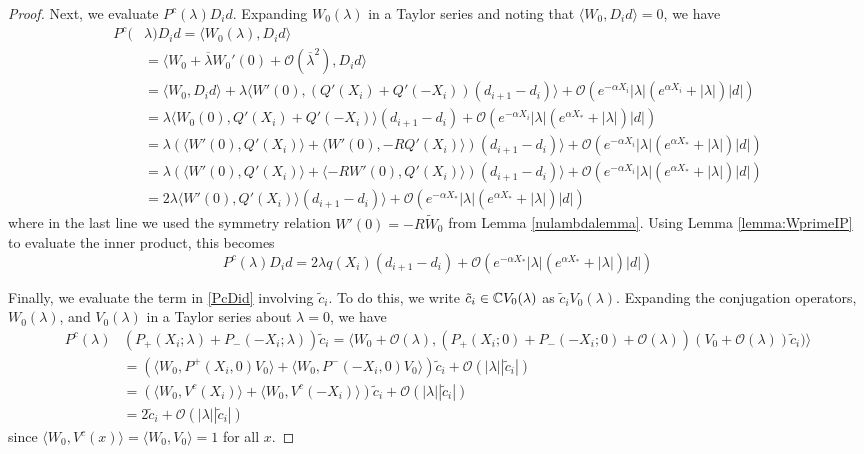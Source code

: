 \documentclass[thesis.tex]{subfiles}
\begin{document}
\begin{lemma}
\begin{proof}
Next, we evaluate $P^c(\lambda)D_i d$. Expanding $W_0(\lambda)$ in a Taylor series and noting that $\langle W_0, D_i d \rangle = 0$, we have 
\begin{align*}
P^c(&\lambda)D_i d = \langle W_0(\lambda), D_i d \rangle \\
&= \langle W_0 + \overline{\lambda} W_0'(0) + \mathcal{O}(\overline{\lambda}^2), D_i d \rangle \\
&= \langle W_0, D_i d \rangle + \lambda \langle W'(0), (Q'(X_i) + Q'(-X_i))(d_{i+1} - d_i ) \rangle + \mathcal{O}(e^{-\alpha X_i} |\lambda|(e^{\alpha X_i} + |\lambda|)|d|) \\
&= \lambda \langle W_0(0), Q'(X_i) + Q'(-X_i) \rangle (d_{i+1} - d_i ) + \mathcal{O}(e^{-\alpha X_i} |\lambda|(e^{\alpha X_*} + |\lambda|)|d|) \\
&= \lambda ( \langle W'(0), Q'(X_i) \rangle + \langle W'(0), -R Q'(X_i)\rangle )(d_{i+1} - d_i ) \rangle + \mathcal{O}(e^{-\alpha X_i} |\lambda|(e^{\alpha X_*} + |\lambda|)|d|)\\
&= \lambda \left( \langle W'(0), Q'(X_i) \rangle + \langle -R W'(0), Q'(X_i)\rangle \right)(d_{i+1} - d_i ) \rangle + \mathcal{O}(e^{-\alpha X_i} |\lambda|(e^{\alpha X_*} + |\lambda|)|d|) \\
&= 2 \lambda \langle W'(0), Q'(X_i) \rangle (d_{i+1} - d_i ) \rangle + \mathcal{O}(e^{-\alpha X_*} |\lambda|(e^{\alpha X_*} + |\lambda|)|d|)
\end{align*}
where in the last line we used the symmetry relation $W'(0) = -R \tilde{W}_0$ from Lemma \ref{nulambdalemma}. Using Lemma \ref{lemma:WprimeIP} to evaluate the inner product, this becomes
\begin{equation}\label{PcDid2}
P^c(\lambda)D_i d = 2 \lambda q(X_i) (d_{i+1} - d_i ) + \mathcal{O}(e^{-\alpha X_*} |\lambda|(e^{\alpha X_*} + |\lambda|)|d|)
\end{equation}

Finally, we evaluate the term in \cref{PcDid} involving $\tilde{c}_i$. To do this, we write $\tilde{c}_i \in \mathbb{C} V_0(\lambda)$ as $\tilde{c}_i V_0(\lambda)$. Expanding the conjugation operators, $W_0(\lambda)$, and $V_0(\lambda)$ in a Taylor series about $\lambda = 0$, we have
\begin{align*}
P^c(\lambda) &(P_+(X_i; \lambda) + P_-(-X_i; \lambda))\tilde{c}_i 
= \langle W_0 + \mathcal{O}(\lambda), (P_+(X_i; 0) + P_-(-X_i; 0) + \mathcal{O}(\lambda))(V_0 + \mathcal{O}(\lambda))\tilde{c}_i) \rangle \\
&= \left( \langle W_0, P^+(X_i, 0)V_0 \rangle + \langle W_0, P^-(-X_i, 0)V_0 \rangle \right)\tilde{c}_i + \mathcal{O}(|\lambda||\tilde{c}_i|) \\
&= \left( \langle W_0, V^c(X_i) \rangle + \langle W_0, V^c(-X_i) \rangle \right)\tilde{c}_i + \mathcal{O}(|\lambda||\tilde{c}_i|) \\
&= 2 \tilde{c}_i + \mathcal{O}(|\lambda||\tilde{c}_i|)
\end{align*}
since $\langle W_0, V^c(x) \rangle = \langle W_0, V_0 \rangle = 1$ for all $x$. 


\end{proof}
\end{lemma}
\end{document}
